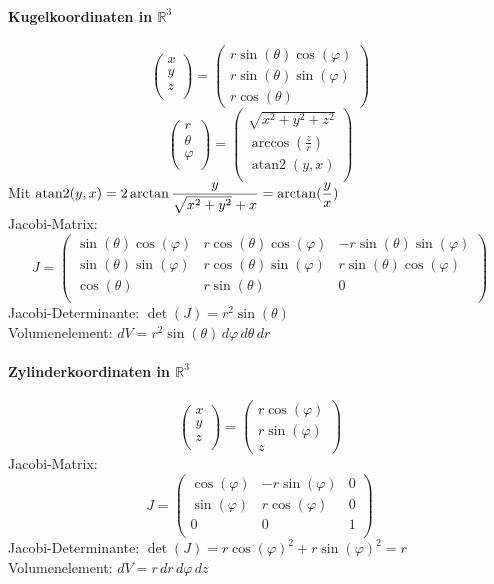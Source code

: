 \documentclass[a4paper, 9pt, DIV=24]{scrartcl}
\newcommand{\R}{\mathbb{R}}
\begin{document}
\paragraph{Kugelkoordinaten in $\R^3$}
\[
\begin{pmatrix}
 x \\ y \\ z \\
\end{pmatrix}
=
\begin{pmatrix}
 r\sin(\theta)\cos(\varphi) \\
 r\sin(\theta)\sin(\varphi) \\
 r\cos(\theta)
\end{pmatrix}
\]
\[
\begin{pmatrix}
  r \\ \theta \\ \varphi \\
\end{pmatrix}
=
\begin{pmatrix}
  \sqrt{x^2 + y^2 + z^2} \\
  \arccos(\frac{z}{r}) \\
  \operatorname{atan2} (y, x) \\
\end{pmatrix}
\]
Mit $\operatorname{atan2} (y, x)= 2 \arctan \dfrac{y}{\sqrt{x^2+y^2}+x} = \arctan(\dfrac{y}{x}) \\$\\
Jacobi-Matrix:
\[
J =
\begin{pmatrix}
 \sin(\theta)\cos(\varphi) & r\cos(\theta)\cos(\varphi) & -r\sin(\theta)\sin(\varphi) \\
 \sin(\theta)\sin(\varphi) & r\cos(\theta)\sin(\varphi) & r\sin(\theta)\cos(\varphi) \\
 \cos(\theta) & r\sin(\theta) & 0 \\
\end{pmatrix}
\]
Jacobi-Determinante: $\det(J) = r^2\sin(\theta)$\\
Volumenelement: $dV = r^2\sin(\theta)\, d\varphi\, d\theta\, dr$

\paragraph{Zylinderkoordinaten in $\R^3$}
\[
\begin{pmatrix}
 x \\ y \\ z \\
\end{pmatrix}
=
\begin{pmatrix}
 r\cos(\varphi) \\
 r\sin(\varphi) \\
 z
\end{pmatrix}
\]
Jacobi-Matrix:
\[
J =
\begin{pmatrix}
 \cos(\varphi) & -r\sin(\varphi) & 0 \\
 \sin(\varphi) &  r\cos(\varphi) & 0 \\
 0 & 0 & 1 \\
\end{pmatrix}
\]
Jacobi-Determinante: $\det(J) = r\cos(\varphi)^2+r\sin(\varphi)^2 = r$\\
Volumenelement: $dV = r\, dr\, d\varphi\, dz$
\end{document}
